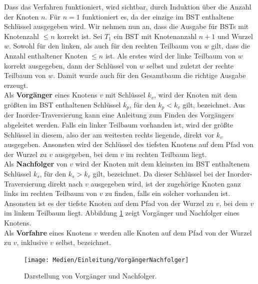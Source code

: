 \documentclass[a4paper,12pt]{article}
\begin{document}
\noindent Dass das Verfahren funktioniert, wird sichtbar, durch Induktion über die Anzahl der Knoten $n$.
Für $n = 1$ funktioniert es, da der einzige im BST enthaltene Schlüssel ausgegeben wird. Wir nehmen nun an, dass die Ausgabe für BSTs mit Knotenzahl $\leq n$ korrekt ist. Sei $T_1$ ein BST mit Knotenanzahl $n + 1$ und Wurzel $w$. Sowohl für den linken, als auch für den rechten Teilbaum von $w$ gilt, dass die Anzahl enthaltener Knoten $\leq n$ ist. Als erstes wird der linke Teilbaum von $w$ korrekt ausgegeben, dann der Schlüssel von $w$ selbst und zuletzt der rechte Teilbaum von $w$. Damit wurde auch für den Gesamtbaum die richtige
Ausgabe erzeugt. \\
Als \textbf{Vorgänger} eines Knotens $v$ mit Schlüssel $k_v$, wird der Knoten mit dem größten im BST enthaltenen Schlüssel $k_p$, für den $k_p < k_v$ gilt, bezeichnet. Aus der Inorder-Traversierung kann eine Anleitung zum Finden des Vorgängers abgeleitet werden. Falls ein linker Teilbaum vorhanden ist, wird der größte Schlüssel in diesem, also der am weitesten rechts liegende, direkt vor $k_v$ ausgegeben. Ansonsten wird der Schlüssel des tiefsten Knotens auf dem Pfad von der Wurzel zu $v$ ausgegeben, bei dem $v$ im rechten Teilbaum liegt. \\
Als \textbf{Nachfolger} von $v$ wird der Knoten mit dem kleinsten im BST enthaltenem Schlüssel $k_s$, für den $k_s > k_v$ gilt, bezeichnet. Da dieser Schlüssel bei der Inorder-Traversierung direkt nach $v$ ausgegeben wird, ist der zugehörige Knoten ganz links im rechten Teilbaum von $v$ zu finden, falls ein solcher vorhanden ist. Ansonsten ist es der tiefste Knoten auf dem Pfad von der Wurzel zu $v$, bei dem $v$ im linkem Teilbaum liegt. Abbildung \ref{fig:VorgängerNachfolger} zeigt Vorgänger und Nachfolger eines Knotens.\\
 Als \textbf{Vorfahre} eines Knotens $v$ werden alle Knoten auf dem Pfad von der Wurzel zu $v$, inklusive $v$ selbst, bezeichnet. 

\begin{figure}[H]
	\centering
	\texttt{[image: Medien/Einleitung/VorgängerNachfolger]}
	\caption{Darstellung von Vorgänger und Nachfolger. }
	\label{fig:VorgängerNachfolger}
\end{figure}
\end{document}
